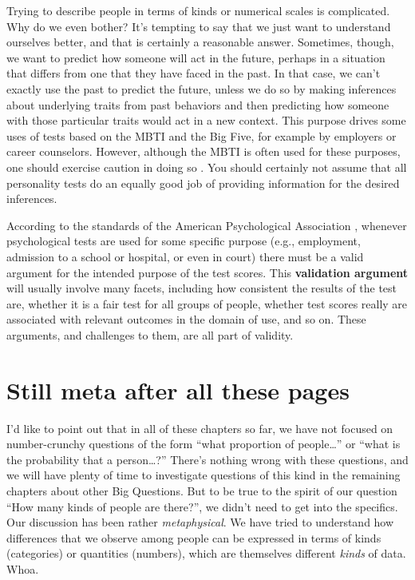 \documentclass[openany]{book}
\begin{document}
Trying to describe people in terms of kinds or numerical scales is complicated. Why do we even bother? It's tempting to say that we just want to understand ourselves better, and that is certainly a reasonable answer. Sometimes, though, we want to predict how someone will act in the future, perhaps in a situation that differs from one that they have faced in the past. In that case, we can't exactly use the past to predict the future, unless we do so by making inferences about underlying traits from past behaviors and then predicting how someone with those particular traits would act in a new context. This purpose drives some uses of tests based on the MBTI and the Big Five, for example by employers or career counselors. However, although the MBTI is often used for these purposes, one should exercise caution in doing so \citep{pittenger1993}. You should certainly not assume that all personality tests do an equally good job of providing information for the desired inferences.

According to the standards of the American Psychological Association \citep{american1999}, whenever psychological tests are used for some specific purpose (e.g., employment, admission to a school or hospital, or even in court) there must be a valid argument for the intended purpose of the test scores. This \textbf{validation argument} will usually involve many facets, including how consistent the results of the test are, whether it is a fair test for all groups of people, whether test scores really are associated with relevant outcomes in the domain of use, and so on. These arguments, and challenges to them, are all part of validity.

\hypertarget{still-meta-after-all-these-pages}{%
\section*{Still meta after all these pages}\label{still-meta-after-all-these-pages}}

I'd like to point out that in all of these chapters so far, we have not focused on number-crunchy questions of the form ``what proportion of people\ldots{}'' or ``what is the probability that a person\ldots{}?'' There's nothing wrong with these questions, and we will have plenty of time to investigate questions of this kind in the remaining chapters about other Big Questions. But to be true to the spirit of our question ``How many kinds of people are there?'', we didn't need to get into the specifics. Our discussion has been rather \emph{metaphysical}. We have tried to understand how differences that we observe among people can be expressed in terms of kinds (categories) or quantities (numbers), which are themselves different \emph{kinds} of data. Whoa.
\end{document}
